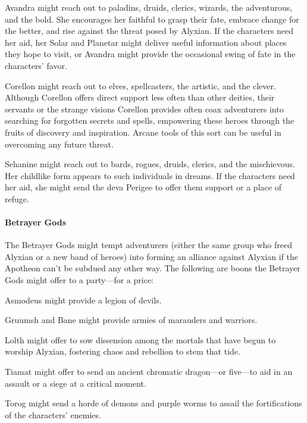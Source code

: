 \documentclass[10pt,a4paper,twoside,bg=print,twocolumn,openany,nodeprecatedcode]{dndbook}
\begin{document}
\begin{description}[nolistsep]
\item[Avandra the Change Bringer.]
Avandra might reach out to paladins, druids, clerics, wizards, the adventurous, and the bold. She encourages her faithful to grasp their fate, embrace change for the better, and rise against the threat posed by Alyxian. If the characters need her aid, her Solar and Planetar might deliver useful information about places they hope to visit, or Avandra might provide the occasional swing of fate in the characters' favor.
\item[Corellon the Arch Heart.]
Corellon might reach out to elves, spellcasters, the artistic, and the clever. Although Corellon offers direct support less often than other deities, their servants or the strange visions Corellon provides often coax adventurers into searching for forgotten secrets and spells, empowering these heroes through the fruits of discovery and inspiration. Arcane tools of this sort can be useful in overcoming any future threat.
\item[Sehanine the Moon Weaver.]
Sehanine might reach out to bards, rogues, druids, clerics, and the mischievous. Her childlike form appears to such individuals in dreams. If the characters need her aid, she might send the deva Perigee to offer them support or a place of refuge.
\end{description}

\paragraph{Betrayer Gods}
The Betrayer Gods might tempt adventurers (either the same group who freed Alyxian or a new band of heroes) into forming an alliance against Alyxian if the Apotheon can't be subdued any other way. The following are boons the Betrayer Gods might offer to a party—for a price:

Asmodeus might provide a legion of devils.

Gruumsh and Bane might provide armies of marauders and warriors.

Lolth might offer to sow dissension among the mortals that have begun to worship Alyxian, fostering chaos and rebellion to stem that tide.

Tiamat might offer to send an ancient chromatic dragon—or five—to aid in an assault or a siege at a critical moment.

Torog might send a horde of demons and purple worms to assail the fortifications of the characters' enemies.
\end{document}
